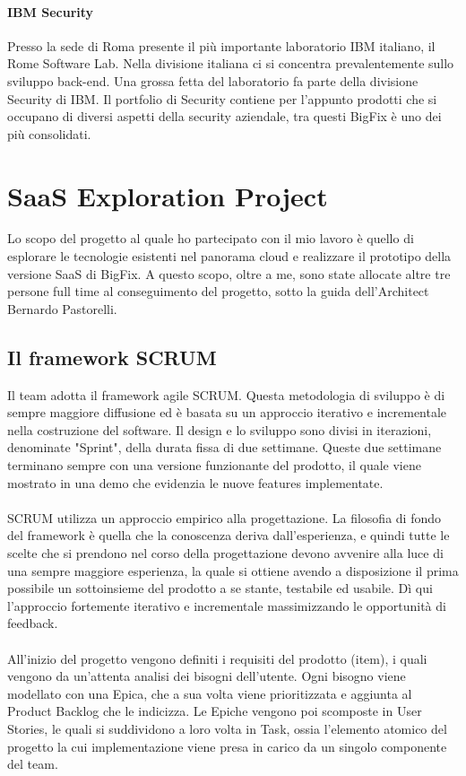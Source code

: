 \paragraph{IBM Security}
Presso la sede di Roma presente il più importante laboratorio IBM italiano, il Rome Software Lab. Nella divisione italiana ci si concentra prevalentemente sullo sviluppo back-end. Una grossa fetta del laboratorio fa parte della divisione Security di IBM. Il portfolio di Security contiene per l'appunto prodotti che si occupano di diversi aspetti della security aziendale, tra questi BigFix è uno dei più consolidati.

\section{SaaS Exploration Project}
Lo scopo del progetto al quale ho partecipato con il mio lavoro è quello di esplorare le tecnologie esistenti nel panorama cloud e realizzare il prototipo della versione SaaS di BigFix. A questo scopo, oltre a me, sono state allocate altre tre persone full time al conseguimento del progetto, sotto la guida dell'Architect Bernardo Pastorelli.

\subsection{Il framework SCRUM}
Il team adotta il framework agile SCRUM. Questa metodologia di sviluppo è di sempre maggiore diffusione ed è basata su un approccio iterativo e incrementale nella costruzione del software. Il design e lo sviluppo sono divisi in iterazioni, denominate "Sprint", della durata fissa di due settimane. Queste due settimane terminano sempre con una versione funzionante del prodotto, il quale viene mostrato in una demo che evidenzia le nuove features implementate.
\paragraph{}
SCRUM utilizza un approccio empirico alla progettazione. La filosofia di fondo del framework è quella che la conoscenza deriva dall'esperienza, e quindi tutte le scelte che si prendono nel corso della progettazione devono avvenire alla luce di una sempre maggiore esperienza, la quale si ottiene avendo a disposizione il prima possibile un sottoinsieme del prodotto a se stante, testabile ed usabile. Dì qui l'approccio fortemente iterativo e incrementale massimizzando le opportunità di feedback. 
\paragraph{} 
All'inizio del progetto vengono definiti i requisiti del prodotto (item), i quali vengono da un'attenta analisi dei bisogni dell'utente. Ogni bisogno viene modellato con una Epica, che a sua volta viene prioritizzata e aggiunta al Product Backlog che le indicizza. Le Epiche vengono poi scomposte in User Stories, le quali si suddividono a loro volta in Task, ossia l'elemento atomico del progetto la cui implementazione viene presa in carico da un singolo componente del team.
